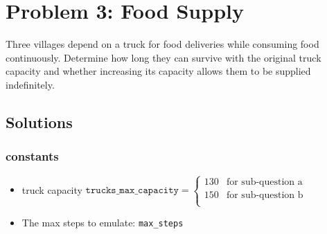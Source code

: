 \section{Problem 3: Food Supply}
Three villages depend on a truck for food deliveries while consuming food continuously.
Determine how long they can survive with the original truck capacity and whether increasing its capacity allows them to be supplied indefinitely.
    \subsection{Solutions}
        
        \subsubsection{constants}
            \begin{itemize}
                \item truck capacity
                    $\texttt{trucks\_max\_capacity} = \begin{cases}
                        130 & \text{for sub-question a } \\
                        150 & \text{for sub-question b } \\
                    \end{cases}$
                \item The max steps to emulate:
                    \texttt{max\_steps}
            \end{itemize}

